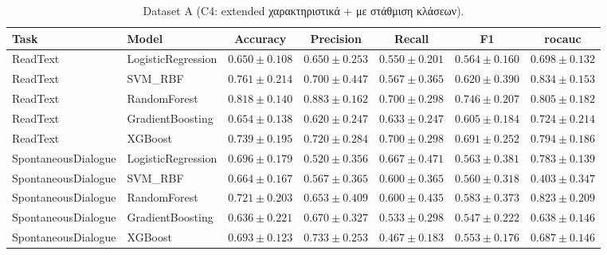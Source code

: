 \begin{table}[H]
    \centering
    \caption{Dataset A (C4: extended χαρακτηριστικά + με στάθμιση κλάσεων).}
    \label{tab:results-c4-dataset-a}
    \scriptsize
    \begin{tabular}{@{}llccccc@{}}
        \toprule
        Task & Model & Accuracy & Precision & Recall & F1 & \gls{rocauc} \\
        \midrule
        ReadText & LogisticRegression & $0.650 \pm 0.108$ & $0.650 \pm 0.253$ & $0.550 \pm 0.201$ & $0.564 \pm 0.160$ & $0.698 \pm 0.132$ \\
        ReadText & SVM\_RBF & $0.761 \pm 0.214$ & $0.700 \pm 0.447$ & $0.567 \pm 0.365$ & $0.620 \pm 0.390$ & $0.834 \pm 0.153$ \\
        ReadText & RandomForest & $0.818 \pm 0.140$ & $0.883 \pm 0.162$ & $0.700 \pm 0.298$ & $0.746 \pm 0.207$ & $0.805 \pm 0.182$ \\
        ReadText & GradientBoosting & $0.654 \pm 0.138$ & $0.620 \pm 0.247$ & $0.633 \pm 0.247$ & $0.605 \pm 0.184$ & $0.724 \pm 0.214$ \\
        ReadText & XGBoost & $0.739 \pm 0.195$ & $0.720 \pm 0.284$ & $0.700 \pm 0.298$ & $0.691 \pm 0.252$ & $0.794 \pm 0.186$ \\
        \midrule
        SpontaneousDialogue & LogisticRegression & $0.696 \pm 0.179$ & $0.520 \pm 0.356$ & $0.667 \pm 0.471$ & $0.563 \pm 0.381$ & $0.783 \pm 0.139$ \\
        SpontaneousDialogue & SVM\_RBF & $0.664 \pm 0.167$ & $0.567 \pm 0.365$ & $0.600 \pm 0.365$ & $0.560 \pm 0.318$ & $0.403 \pm 0.347$ \\
        SpontaneousDialogue & RandomForest & $0.721 \pm 0.203$ & $0.653 \pm 0.409$ & $0.600 \pm 0.435$ & $0.583 \pm 0.373$ & $0.823 \pm 0.209$ \\
        SpontaneousDialogue & GradientBoosting & $0.636 \pm 0.221$ & $0.670 \pm 0.327$ & $0.533 \pm 0.298$ & $0.547 \pm 0.222$ & $0.638 \pm 0.146$ \\
        SpontaneousDialogue & XGBoost & $0.693 \pm 0.123$ & $0.733 \pm 0.253$ & $0.467 \pm 0.183$ & $0.553 \pm 0.176$ & $0.687 \pm 0.146$ \\
        \bottomrule
    \end{tabular}
\end{table}

